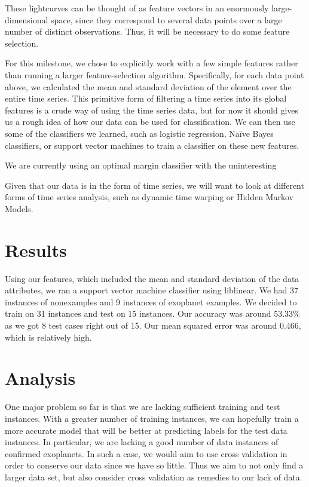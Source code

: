 \documentclass{amsart}
\begin{document}
These lightcurves can be thought of as feature vectors in an enormously large-dimensional space, since they correspond to several data points over a large number of distinct observations. Thus, it will be necessary to do some feature selection.

For this milestone, we chose to explicitly work with a few simple features rather than running a larger feature-selection algorithm. Specifically, for each data point above, we calculated the mean and standard deviation of the element over the entire time series. 
This primitive form of filtering a time series into its global features is a crude way of using the time series data, but for now it should gives us a rough idea of how our data can be used for classification. We can then use some of the classifiers we learned, such as logistic regression, Na\"ive Bayes classifiers, or support vector machines to train a classifier on these new features. 

We are currently using an optimal margin classifier with the uninteresting

Given that our data is in the form of time series, we will want to look at different forms of time series analysis, such as dynamic time warping or Hidden Markov Models. 

\section{Results}
Using our features, which included the mean and standard deviation of the data attributes, we ran a support vector machine classifier using liblinear. We had 37 instances of nonexamples and 9 instances of exoplanet examples. We decided to train on 31 instances and test on 15 instances. Our accuracy was around 53.33\% as we got 8 test cases right out of 15. Our mean squared error was around 0.466, which is relatively high. 

\section{Analysis}
One major problem so far is that we are lacking sufficient training and test instances. With a greater number of training instances, we can hopefully train a more accurate model that will be better at predicting labels for the test data instances. In particular, we are lacking a good number of data instances of confirmed exoplanets. In such a case, we would aim to use cross validation in order to conserve our data since we have so little. Thus we aim to not only find a larger data set, but also consider cross validation as remedies to our lack of data.
\end{document}
